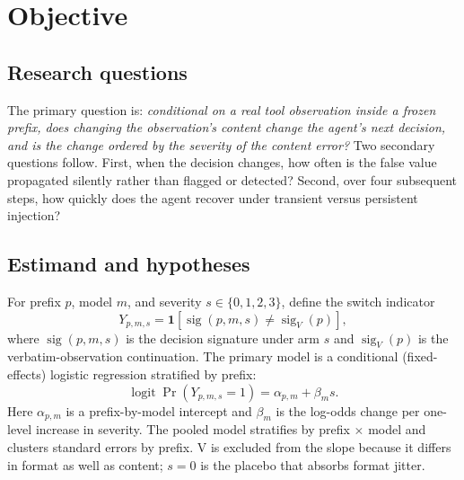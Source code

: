 \documentclass[11pt,a4paper]{article}
\begin{document}
\section{Objective}

\subsection{Research questions}
The primary question is: \emph{conditional on a real tool observation inside a frozen prefix, does
changing the observation's content change the agent's next decision, and is the change ordered by
the severity of the content error?} Two secondary questions follow. First, when the decision changes, how often is the false value
propagated silently rather than flagged or detected? Second, over four subsequent steps, how
quickly does the agent recover under transient versus persistent injection?

\subsection{Estimand and hypotheses}
For prefix $p$, model $m$, and severity $s \in \{0,1,2,3\}$, define the switch indicator
\begin{equation}
Y_{p,m,s} = \mathbf{1}\!\left[\operatorname{sig}(p,m,s)\neq \operatorname{sig}_{V}(p)\right],
\label{eq:switch}
\end{equation}
where $\operatorname{sig}(p,m,s)$ is the decision signature under arm $s$ and
$\operatorname{sig}_{V}(p)$ is the verbatim-observation continuation. The primary model is a
conditional (fixed-effects) logistic regression stratified by prefix:
\begin{equation}
\operatorname{logit}\Pr(Y_{p,m,s}=1)=\alpha_{p,m}+\beta_m s .
\label{eq:primary}
\end{equation}
Here $\alpha_{p,m}$ is a prefix-by-model intercept and $\beta_m$ is the log-odds change per one-level
increase in severity. The pooled model stratifies by prefix $\times$ model and clusters standard
errors by prefix. V is excluded from the slope because it differs in format as well as content;
$s=0$ is the placebo that absorbs format jitter.
\end{document}

